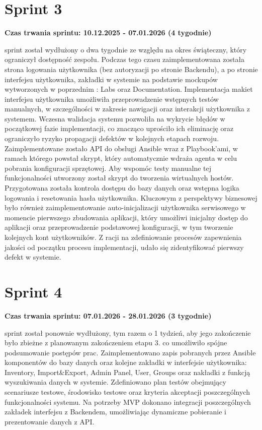 \section{Sprint 3}
\textbf{Czas trwania \Gls{sprint}u: 10.12.2025 - 07.01.2026 (4 tygodnie)}
\par
\Gls{sprint} został wydłużony o dwa tygodnie ze względu na okres świąteczny, który ograniczył dostępność zespołu. Podczas tego czasu zaimplementowana została strona logowania użytkownika (bez autoryzacji po stronie \gls{Backend}u), a po stronie interfejsu użytkownika, zakładki w systemie na podstawie \gls{mockup}ów wytworzonych w poprzednim : Labs oraz Documentation.
Implementacja makiet interfejsu użytkownika umożliwiła przeprowadzenie wstępnych testów manualnych, w szczególności w zakresie nawigacji oraz interakcji użytkownika z systemem. Wczesna walidacja systemu pozwoliła na wykrycie błędów w początkowej fazie implementacji, co znacząco uprościło ich eliminację oraz ograniczyło ryzyko propagacji defektów w kolejnych etapach rozwoju.
Zaimplementowane zostało \gls{API} do obsługi \gls{Ansible} wraz z \gls{Playbook}'ami, w ramach którego powstał skrypt, który automatycznie wdraża agenta w celu pobrania konfiguracji sprzętowej. Aby wspomóc testy manualne tej funkcjonalności utworzony został skrypt do tworzenia wirtualnych hostów.
Przygotowana została kontrola dostępu do bazy danych oraz wstępna logika logowania i resetowania hasła użytkownika.
Kluczowym z perspektywy biznesowej było również zaimplementowanie auto-inicjalizacji użytkownika serwisowego w momencie pierwszego zbudowania aplikacji, który umożliwi inicjalny dostęp do aplikacji oraz przeprowadzenie podstawowej konfiguracji, w tym tworzenie kolejnych kont użytkowników.
Z racji na zdefiniowanie procesów zapewnienia jakości od początku procesu implementacji, udało się zidentyfikować pierwszy defekt w systemie.

\section{Sprint 4}
\textbf{Czas trwania \Gls{sprint}u: 07.01.2026 - 28.01.2026 (3 tygodnie)}
\par
\Gls{sprint} został ponownie wydłużony, tym razem o 1 tydzień, aby jego zakończenie było zbieżne z planowanym zakończeniem etapu 3. co umożliwiło spójne podsumowanie postępów prac.
Zaimplementowano zapis pobranych przez \gls{Ansible} komponentów do bazy danych oraz kolejne zakładki w interfejsie użytkownika: Inventory, Import\&Export, Admin Panel, User, Groups oraz nakładki z funkcją wyszukiwania danych w systemie.
Zdefiniowano plan testów obejmujący scenariusze testowe, środowisko testowe oraz kryteria akceptacji poszczególnych funkcjonalności systemu.
Na potrzeby \gls{MVP} dokonano integracji poszczególnych zakładek interfejsu z \gls{Backend}em, umożliwiając dynamiczne pobieranie i prezentowanie danych z \gls{API}.

